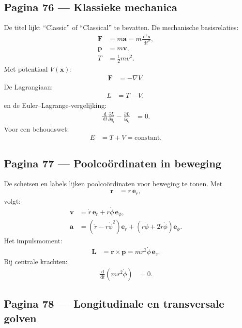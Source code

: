 \documentclass[11pt]{article}
\newcommand{\dd}{\,\mathrm{d}}
\newcommand{\pd}[2]{\frac{\partial #1}{\partial #2}}
\newcommand{\td}[2]{\frac{\dd #1}{\dd #2}}
\newcommand{\vect}[1]{\mathbf{#1}}
\begin{document}
\subsection*{Pagina 76 --- Klassieke mechanica}

De titel lijkt ``Classic'' of ``Classical'' te bevatten. De mechanische basisrelaties:
\begin{align*}
\vect{F}
&=
m\vect{a}
=
m\td{^2\vect{x}}{t^2},\\
\vect{p}
&=
m\vect{v},\\
T&=\frac{1}{2}m v^2.
\end{align*}
Met potentiaal $V(\vect{x})$:
\begin{align*}
\vect{F}
&=
-\nabla V.
\end{align*}
De Lagrangiaan:
\begin{align*}
L
&=
T-V,
\end{align*}
en de Euler--Lagrange-vergelijking:
\begin{align*}
\td{}{t}\pd{L}{\dot q_i}
-
\pd{L}{q_i}
&=0.
\end{align*}
Voor een behoudswet:
\begin{align*}
E
&=
T+V
=
\text{constant}.
\end{align*}

\subsection*{Pagina 77 --- Poolcoördinaten in beweging}

De schetsen en labels lijken poolcoördinaten voor beweging te tonen. Met
\begin{align*}
\vect{r}
&=
r\,\vect{e}_r,
\end{align*}
volgt:
\begin{align*}
\vect{v}
&=
\dot r\,\vect{e}_r
+
r\dot\phi\,\vect{e}_\phi,\\
\vect{a}
&=
(\ddot r-r\dot\phi^2)\vect{e}_r
+
(r\ddot\phi+2\dot r\dot\phi)\vect{e}_\phi.
\end{align*}
Het impulsmoment:
\begin{align*}
\vect{L}
&=
\vect{r}\times\vect{p}
=
m r^2\dot\phi\,\vect{e}_z.
\end{align*}
Bij centrale krachten:
\begin{align*}
\td{}{t}\left(mr^2\dot\phi\right)&=0.
\end{align*}

\subsection*{Pagina 78 --- Longitudinale en transversale golven}
\end{document}
